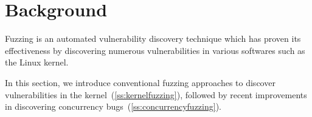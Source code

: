 \section{Background}
\label{s:background}

%

Fuzzing is an automated vulnerability discovery technique which has
proven its effectiveness by discovering numerous vulnerabilities in
various softwares such as the Linux kernel.

In this section, we introduce conventional fuzzing approaches to
discover vulnerabilities in the kernel~(\autoref{ss:kernelfuzzing}),
followed by recent improvements in discovering concurrency
bugs~(\autoref{ss:concurrencyfuzzing}).










